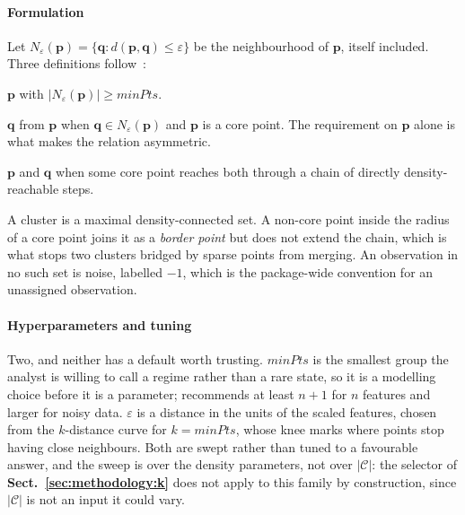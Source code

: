 \paragraph{Formulation}
\label{sec:tech:dbscan:formulation}
Let $N_\varepsilon(\mathbf p) = \{\mathbf q : d(\mathbf p, \mathbf q) \le
\varepsilon\}$ be the neighbourhood of $\mathbf p$, itself included. Three
definitions follow~\cite{ref_36}:
\begin{description}[itemsep=2pt,topsep=2pt]
    \item[Core point] $\mathbf p$ with $|N_\varepsilon(\mathbf p)| \ge
    \mathit{minPts}$.
    \item[Directly density-reachable] $\mathbf q$ from $\mathbf p$ when
    $\mathbf q \in N_\varepsilon(\mathbf p)$ and $\mathbf p$ is a core
    point. The requirement on $\mathbf p$ alone is what makes the relation
    asymmetric.
    \item[Density-connected] $\mathbf p$ and $\mathbf q$ when some core
    point reaches both through a chain of directly density-reachable
    steps.
\end{description}
A cluster is a maximal density-connected set. A non-core point inside the
radius of a core point joins it as a \emph{border point} but does not
extend the chain, which is what stops two clusters bridged by sparse
points from merging. An observation in no such set is noise, labelled
$-1$, which is the package-wide convention for an unassigned observation.

\paragraph{Hyperparameters and tuning}
\label{sec:tech:dbscan:hyperparameters}
Two, and neither has a default worth trusting. $\mathit{minPts}$ is the
smallest group the analyst is willing to call a regime rather than a rare
state, so it is a modelling choice before it is a parameter;
\cite{ref_37} recommends at least $n + 1$ for $n$ features and larger for
noisy data. $\varepsilon$ is a distance in the units of the scaled
features, chosen from the $k$-distance curve for $k = \mathit{minPts}$,
whose knee marks where points stop having close neighbours. Both are swept
rather than tuned to a favourable answer, and the sweep is over the
density parameters, not over $|\mathcal C|$: the selector of
\textbf{Sect.~\ref{sec:methodology:k}} does not apply to this family by
construction, since $|\mathcal C|$ is not an input it could vary.

